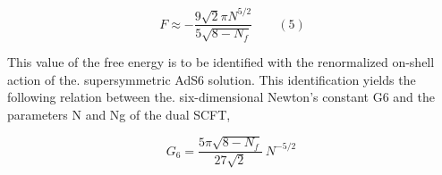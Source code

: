 \documentclass{article}
\begin{document}
\begin{equation}
F \approx - \frac { 9 \sqrt { 2 } \pi N ^ { 5 / 2 } } { 5 \sqrt { 8 - N _ { f } } } \qquad ( 5 )
\end{equation}


This value of the free energy is to be identified with the renormalized on-shell action of the.
supersymmetric AdS6 solution. This identification yields the following relation between the.
six-dimensional Newton's constant G6 and the parameters N and Ng of the dual SCFT,


\begin{equation}
G _ { 6 } = \frac { 5 \pi \sqrt { 8 - N _ { f } } } { 2 7 \sqrt { 2 } } ~ N ^ { - 5 / 2 } ~
\end{equation}
\end{document}
